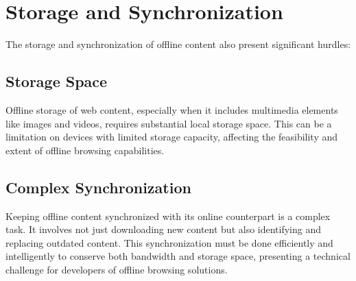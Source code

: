 \documentclass[12pt]{article}
\begin{document}
\citep*{Microsoft}
\section{Storage and Synchronization}

The storage and synchronization of offline content also present significant hurdles:

\subsection{Storage Space}

Offline storage of web content, especially when it includes multimedia elements like images and videos, requires substantial local storage space. This can be a limitation on devices with limited storage capacity, affecting the feasibility and extent of offline browsing capabilities.

\subsection{Complex Synchronization}

Keeping offline content synchronized with its online counterpart is a complex task. It involves not just downloading new content but also identifying and replacing outdated content. This synchronization must be done efficiently and intelligently to conserve both bandwidth and storage space, presenting a technical challenge for developers of offline browsing solutions.

\citep*{Microsoft}
     
\end{document}
